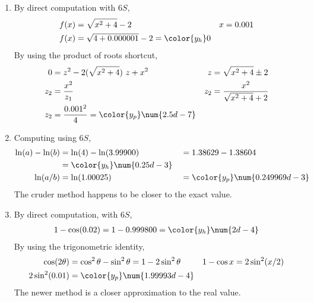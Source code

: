 \begin{enumerate}
    \item By direct computation with $ 6S $,
          \begin{align}
              f(x) & = \sqrt{x^2 + 4} - 2                      &
              x    & = 0.001                                     \\
              f(x) & = \sqrt{4 + 0.000001} - 2 = \color{y_h} 0
          \end{align}
          By using the product of roots shortcut,
          \begin{align}
              0   & = z^2  - 2 (\sqrt{x^2 + 4})\ z + x^2 &
              z   & = \sqrt{x^2 + 4} \pm 2                 \\
              z_2 & = \frac{x^2}{z_1}                    &
              z_2 & = \frac{x^2}{\sqrt{x^2 + 4} + 2}       \\
              z_2 & = \frac{0.001^2}{4}
              = \color{y_p} \num{2.5d-7}
          \end{align}

    \item Computing using $ 6S $,
          \begin{align}
              \ln(a) - \ln(b) & = \ln(4) - \ln(3.99900)         &
                              & = 1.38629 - 1.38604               \\
                              & = \color{y_h} \num{0.25d-3}       \\
              \ln(a/b)        & = \ln(1.00025)                  &
                              & = \color{y_p} \num{0.249969d-3}
          \end{align}
          The cruder method happens to be closer to the exact value.

    \item By direct computation, with $ 6S $,
          \begin{align}
              1 - \cos(0.02) = 1 - 0.999800 = \color{y_h} \num{2d-4}
          \end{align}
          By using the trigonometric identity,
          \begin{align}
              \cos(2\theta) & = \cos^2\theta - \sin^2\theta = 1 - 2\sin^2\theta &
              1 - \cos x    & = 2\sin^2(x/2)                                      \\
              2\sin^2(0.01) & = \color{y_p} \num{1.99993d-4}
          \end{align}
          The newer method is a closer approximation to the real value.


\end{enumerate}

